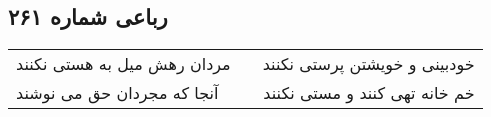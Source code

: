 \begin{center}
\section*{رباعی شماره ۲۶۱}
\label{sec:sh261}
\begin{longtable}{l p{0.5cm} r}
مردان رهش میل به هستی نکنند
&&
خودبینی و خویشتن پرستی نکنند
\\
آنجا که مجردان حق می نوشند
&&
خم خانه تهی کنند و مستی نکنند
\\
\end{longtable}
\end{center}
